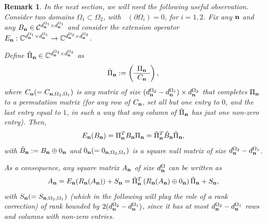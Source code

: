 \documentclass[10pt,a4paper]{amsart}
\newtheorem{rem}{Remark}
\DeclareMathOperator{\Ld}{\mathcal{L}^d}
\begin{document}
\begin{rem}\label{rem_obs_ext_operator}
    In the next section, we will need the following useful observation.
    Consider two domains $\Omega_1\subset\Omega_2$, with $\Ld(\partial\Omega_i)=0$, for $i=1,2$. Fix any $\mathbf n$ and any $B_\mathbf n\in\mathcal{C}^{d_\mathbf n^{\Omega_1}\times d_\mathbf n^{\Omega_1}}$ and consider the extension operator $E_{\mathbf n}:\mathbb{C}^{d_{\mathbf n}^{\Omega_1}\times d_{\mathbf n}^{\Omega_1}}\to\mathbb{C}^{d_{\mathbf n}^{\Omega_2}\times d_{\mathbf n}^{\Omega_2}}$. 
    
    Define $\tilde{\Pi}_\mathbf n\in\mathbb{C}^{d_{\mathbf n}^{\Omega_2}\times d_{\mathbf n}^{\Omega_2}}$ as 
    \begin{equation*}
           \tilde{\Pi}_\mathbf n:= \left(
    \begin{array}{c} 
      \Pi_\mathbf n \\
      \hline
      C_\mathbf n
    \end{array} 
    \right), 
    \end{equation*}
    where $C_\mathbf n(=C_{\mathbf n,\Omega_2,\Omega_1})$ is any matrix of size $(d_\mathbf n^{\Omega_2}-d_\mathbf n^{\Omega_1})\times d_\mathbf n^{\Omega_2}$ that completes $\Pi_\mathbf n$ to a permutation matrix (for any row of $C_\mathbf n$, set all but one entry to $0$, and the last entry equal to $1$, in such a way that any column of $\tilde{\Pi}_\mathbf n$ has just one non-zero entry). Then, 
    \begin{equation*}
        E_\mathbf n(B_\mathbf n)=\Pi_\mathbf n^{T}B_\mathbf n\Pi_\mathbf n=\tilde{\Pi}_\mathbf n^{T}\tilde{B}_\mathbf n\tilde{\Pi}_\mathbf n,
    \end{equation*}
    with $\tilde{B}_\mathbf n:=B_\mathbf n\oplus0_\mathbf n$ and $0_\mathbf n(=0_{\mathbf n,\Omega_2,\Omega_1})$ is a square null matrix of size $d_\mathbf n^{\Omega_2}-d_\mathbf n^{\Omega_1}$.
    
    As a consequence, any square matrix $A_\mathbf n$ of size $d_\mathbf n^{\Omega}$ can be written as 
    \begin{equation}\label{restr_ext_identity}
        A_\bfn=E_\bfn(R_\bfn(A_\bfn))+S_\bfn=\tilde{\Pi}_\bfn^{T}\left(R_\bfn(A_\bfn)\oplus0_\bfn\right)\tilde{\Pi}_\bfn+S_\bfn,
    \end{equation}
    with $S_\mathbf n(=S_{\mathbf n,\Omega_2,\Omega_1})$ (which in the following will play the role of a rank correction) of rank bounded by $2(d_\mathbf n^{\Omega_2}-d_\mathbf n^{\Omega_1})$, since it has at most $d_\mathbf n^{\Omega_2}-d_\mathbf n^{\Omega_1}$ rows and columns with non-zero entries.
\end{rem}
\end{document}
